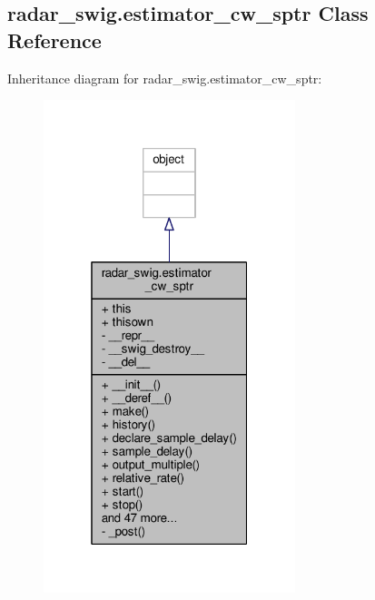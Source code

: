 \subsection{radar\+\_\+swig.\+estimator\+\_\+cw\+\_\+sptr Class Reference}
\label{classradar__swig_1_1estimator__cw__sptr}


Inheritance diagram for radar\+\_\+swig.\+estimator\+\_\+cw\+\_\+sptr\+:
\nopagebreak
\begin{figure}[H]
\begin{center}
\leavevmode
\includegraphics[width=208pt]{d1/d46/classradar__swig_1_1estimator__cw__sptr__inherit__graph}
\end{center}
\end{figure}


